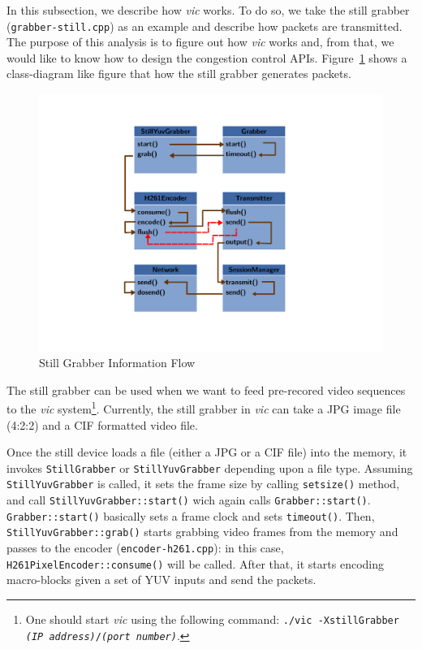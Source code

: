 In this subsection, we describe how \emph{vic} works. To do so, we take the
still grabber (\texttt{grabber-still.cpp}) as an example and describe how
packets are transmitted.  The purpose of this analysis is to figure out how
\emph{vic} works and, from that, we would like to know how to design the
congestion control APIs.  Figure~\ref{fig:still-grabber} shows a class-diagram
like figure that how the still grabber generates packets.

\begin{figure}[!h] 
\begin{center}
\includegraphics[scale=.5]{./img/still-grabber}
\caption{\label{fig:still-grabber}Still Grabber Information Flow}
\end{center} 
\end{figure}

The still grabber can be used when we want to feed pre-recored video sequences
to the \emph{vic} system\footnote{One should start \emph{vic} using the
following command: \texttt{./vic -XstillGrabber \emph{(IP address)}/\emph{(port
number)}}.}. Currently, the still grabber in \emph{vic} can take a JPG image
file (4:2:2) and a CIF formatted video file.

Once the still device loads a file (either a JPG or a CIF file) into the memory,
it invokes \texttt{StillGrabber} or \texttt{StillYuvGrabber} depending upon a
file type. Assuming \texttt{StillYuvGrabber} is called, it sets the frame size
by calling \texttt{setsize()} method, and call \texttt{StillYuvGrabber::start()}
wich again calls \texttt{Grabber::start()}.  \texttt{Grabber::start()} basically
sets a frame clock and sets \texttt{timeout()}. Then,
\texttt{StillYuvGrabber::grab()} starts grabbing video frames from the memory
and passes to the encoder (\texttt{encoder-h261.cpp}): in this case,
\texttt{H261PixelEncoder::consume()} will be called. After that, it starts
encoding macro-blocks given a set of YUV inputs and send the packets.

\newpage
